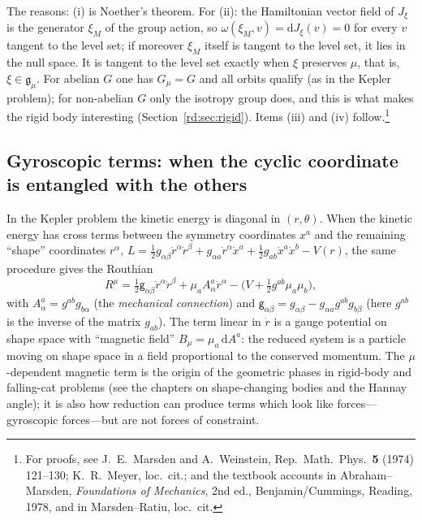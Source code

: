 The reasons: (i) is Noether's theorem. For (ii): the Hamiltonian vector field of $J_\xi$ is the generator $\xi_M$ of the group action, so $\omega(\xi_M,v)=\mathrm dJ_\xi(v)=0$ for every $v$ tangent to the level set; if moreover $\xi_M$ itself is tangent to the level set, it lies in the null space. It is tangent to the level set exactly when $\xi$ preserves $\mu$, that is, $\xi\in\mathfrak g_\mu$. For abelian $G$ one has $G_\mu=G$ and all orbits qualify (as in the Kepler problem); for non-abelian $G$ only the isotropy group does, and this is what makes the rigid body interesting (Section~\ref{rd:sec:rigid}). Items (iii) and (iv) follow.\footnote{For proofs, see J.\ E.\ Marsden and A.\ Weinstein, Rep.\ Math.\ Phys.\ \textbf{5} (1974) 121--130; K.\ R.\ Meyer, loc.\ cit.; and the textbook accounts in Abraham--Marsden, \emph{Foundations of Mechanics}, 2nd ed., Benjamin/Cummings, Reading, 1978, and in Marsden--Ratiu, loc.\ cit.}

\subsection{Gyroscopic terms: when the cyclic coordinate is entangled with the others}\label{rd:sec:gyro}

In the Kepler problem the kinetic energy is diagonal in $(r,\theta)$. When the kinetic energy has cross terms between the symmetry coordinates $x^a$ and the remaining ``shape'' coordinates $r^\alpha$, $L=\tfrac12g_{\alpha\beta}\dot r^\alpha\dot r^\beta+g_{\alpha a}\dot r^\alpha\dot x^a+\tfrac12g_{ab}\dot x^a\dot x^b-V(r)$, the same procedure gives the Routhian
\begin{equation}\label{rd:routhfull}
R^\mu=\tfrac12\mathsf g_{\alpha\beta}\dot r^\alpha\dot r^\beta+\mu_aA^a_\alpha\dot r^\alpha-\Big(V+\tfrac12g^{ab}\mu_a\mu_b\Big),
\end{equation}
with $A^a_\alpha=g^{ab}g_{b\alpha}$ (the \emph{mechanical connection}) and $\mathsf g_{\alpha\beta}=g_{\alpha\beta}-g_{\alpha a}g^{ab}g_{b\beta}$ (here $g^{ab}$ is the inverse of the matrix $g_{ab}$). The term linear in $\dot r$ is a gauge potential on shape space with ``magnetic field'' $B_\mu=\mu_a\,\mathrm dA^a$: the reduced system is a particle moving on shape space in a field proportional to the conserved momentum. The $\mu$-dependent magnetic term is the origin of the geometric phases in rigid-body and falling-cat problems (see the chapters on shape-changing bodies and the Hannay angle); it is also how reduction can produce terms which look like forces---gyroscopic forces---but are not forces of constraint.

